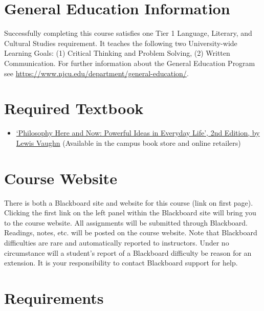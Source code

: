 \documentclass[article,oneside]{memoir}
\begin{document}
\section{General Education Information} 
Successfully completing this course satisfies one Tier 1 Language, Literary, and Cultural Studies requirement. It teaches the following two University-wide Learning Goals: (1) Critical Thinking and Problem Solving, (2) Written Communication. For further information about the General Education Program see \href{https://www.njcu.edu/department/general-education}{https://www.njcu.edu/department/general-education/}.


\section{Required Textbook}

\begin{itemize}
\item
  \href{http://www.amazon.com/Philosophy-Here-Now-Powerful-Everyday/dp/0190207035/ref=dp_ob_title_bk}{`Philosophy  Here and Now: Powerful Ideas in Everyday Life', 2nd Edition, by Lewis Vaughn}  (Available in the campus book store and online retailers)
\end{itemize}


\section{Course Website}
There is both a Blackboard site and website for this course (link on first page). Clicking the first link on the left panel within the Blackboard site will bring you to the course website. All assignments will be submitted through Blackboard. Readings, notes, etc. will be posted on the course website. Note that Blackboard difficulties are rare and automatically reported to instructors. Under no circumstance will a student's report of a Blackboard difficulty be reason for an extension. It is your responsibility to contact Blackboard support for help.




\section{Requirements}
\end{document}

